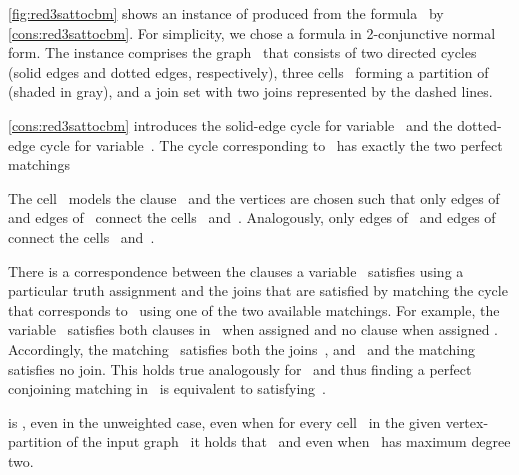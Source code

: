 \begin{example}\label{ex:red3sattocbm}
  \autoref{fig:red3sattocbm} shows an instance of \pCBMs{} produced from the formula~ by \autoref{cons:red3sattocbm}. For simplicity, we chose a formula in 2-conjunctive normal form. The instance comprises the graph~ that consists of two directed cycles (solid edges and dotted edges, respectively), three cells~ forming a partition of~ (shaded in gray), and a join set with two joins represented by the dashed lines.

  \autoref{cons:red3sattocbm} introduces the solid-edge cycle for variable~ and the dotted-edge cycle for variable~. The cycle corresponding to~ has exactly the two perfect matchings

The cell~ models the clause~ and the vertices are chosen such that only edges of~ and edges of~ connect the cells~ and~. Analogously, only edges of~ and edges of~ connect the cells~ and~.

  There is a correspondence between the clauses a variable~ satisfies using a particular truth assignment and the joins that are satisfied by matching the cycle that corresponds to~ using one of the two available matchings. For example, the variable~ satisfies both clauses in~ when assigned  and no clause when assigned . Accordingly, the matching~ satisfies both the joins~, and~ and the matching~ satisfies no join. This holds true analogously for~ and thus finding a perfect conjoining matching in~ is equivalent to satisfying~.
\end{example}
\begin{lemma}
  \pCBMs{} is \NPh{}, even in the unweighted case, even when for every cell~ in the given vertex-partition of the input graph~ it holds that~ and even when~ has maximum degree two.
\end{lemma}
